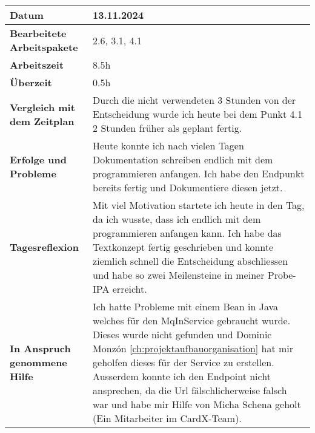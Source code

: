 \begin{longtable}{p{}|p{}}
	\hline
	\textbf{Datum}                       & 13.11.2024            \\
	\hline
	\textbf{Bearbeitete Arbeitspakete}   & 2.6, 3.1, 4.1                  \\
	\hline
	\textbf{Arbeitszeit}                 & 8.5h                                    \\
	\hline
	\textbf{Überzeit}                    & 0.5h                                    \\
	\hline
	\textbf{Vergleich mit dem Zeitplan}  & Durch die nicht verwendeten 3 Stunden von der Entscheidung wurde ich heute bei dem Punkt 4.1 2 Stunden früher als geplant fertig. \\
	\hline
	\textbf{Erfolge und Probleme} & Heute konnte ich nach vielen Tagen Dokumentation schreiben endlich mit dem programmieren anfangen. Ich habe den Endpunkt bereits fertig und Dokumentiere diesen jetzt.
	\\
	\hline
	\textbf{Tagesreflexion} & Mit viel Motivation startete ich heute in den Tag, da ich wusste, dass ich endlich mit dem programmieren anfangen kann. Ich habe das Textkonzept fertig geschrieben und konnte ziemlich schnell die Entscheidung abschliessen und habe so zwei Meilensteine in meiner Probe-IPA erreicht.
	\\
	\hline
	\textbf{In Anspruch genommene Hilfe} & Ich hatte Probleme mit einem Bean in Java welches für den MqInService gebraucht wurde. Dieses wurde nicht gefunden und Dominic Monzón \ref{ch:projektaufbauorganisation} hat mir geholfen dieses für der Service zu erstellen. Ausserdem konnte ich den Endpoint nicht ansprechen, da die Url fälschlicherweise falsch war und habe mir Hilfe von Micha Schena geholt (Ein Mitarbeiter im CardX-Team).                              \\
	\hline
\end{longtable}\label{tab:arbeitsprotokoll-13.11.2024}
\newpage

